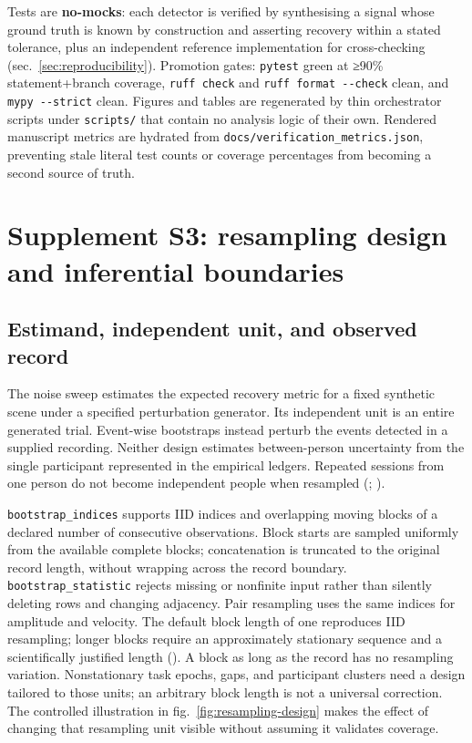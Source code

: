 \documentclass[
]{article}
\begin{document}
Tests are \textbf{no-mocks}: each detector is verified by synthesising a
signal whose ground truth is known by construction and asserting
recovery within a stated tolerance, plus an independent reference
implementation for cross-checking (sec.~\ref{sec:reproducibility}).
Promotion gates: \texttt{pytest} green at ≥90\% statement+branch
coverage, \texttt{ruff\ check} and \texttt{ruff\ format\ -\/-check}
clean, and \texttt{mypy\ -\/-strict} clean. Figures and tables are
regenerated by thin orchestrator scripts under \texttt{scripts/} that
contain no analysis logic of their own. Rendered manuscript metrics are
hydrated from \texttt{docs/verification\_metrics.json}, preventing stale
literal test counts or coverage percentages from becoming a second
source of truth.

\section{Supplement S3: resampling design and inferential
boundaries}\label{sec:resampling-design}

\subsection{Estimand, independent unit, and observed
record}\label{estimand-independent-unit-and-observed-record}

The noise sweep estimates the expected recovery metric for a fixed
synthetic scene under a specified perturbation generator. Its
independent unit is an entire generated trial. Event-wise bootstraps
instead perturb the events detected in a supplied recording. Neither
design estimates between-person uncertainty from the single participant
represented in the empirical ledgers. Repeated sessions from one person
do not become independent people when resampled
(;
).

\texttt{bootstrap\_indices} supports IID indices and overlapping moving
blocks of a declared number of consecutive observations. Block starts
are sampled uniformly from the available complete blocks; concatenation
is truncated to the original record length, without wrapping across the
record boundary. \texttt{bootstrap\_statistic} rejects missing or
nonfinite input rather than silently deleting rows and changing
adjacency. Pair resampling uses the same indices for amplitude and
velocity. The default block length of one reproduces IID resampling;
longer blocks require an approximately stationary sequence and a
scientifically justified length
(). A block as long as
the record has no resampling variation. Nonstationary task epochs, gaps,
and participant clusters need a design tailored to those units; an
arbitrary block length is not a universal correction. The controlled
illustration in fig.~\ref{fig:resampling-design} makes the effect of
changing that resampling unit visible without assuming it validates
coverage.
\end{document}
